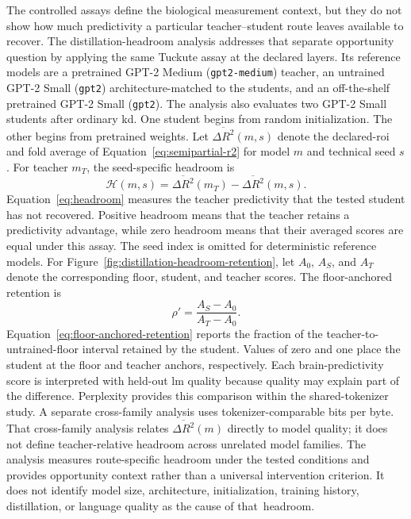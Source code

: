 The controlled assays define the biological measurement context, but they do not show how much predictivity a particular teacher--student route leaves available to recover.
The distillation-headroom analysis addresses that separate opportunity question by applying the same Tuckute assay at the declared layers.
Its reference models are a pretrained GPT-2 Medium (\texttt{gpt2-medium}) teacher, an untrained GPT-2 Small (\texttt{gpt2}) architecture-matched to the students, and an off-the-shelf pretrained GPT-2 Small (\texttt{gpt2}).
The analysis also evaluates two GPT-2 Small students after ordinary \ac{kd}.
One student begins from random initialization.
The other begins from pretrained weights.
Let \(\overline{\Delta R^2}(m,s)\) denote the declared-\ac{roi} and fold average of Equation~\ref{eq:semipartial-r2} for model \(m\) and technical seed \(s\).
For teacher \(m_T\), the seed-specific headroom is
\begin{equation}
\mathcal H(m,s)
=
\overline{\Delta R^2}(m_T)
-
\overline{\Delta R^2}(m,s).
\label{eq:headroom}
\end{equation}
Equation~\ref{eq:headroom} measures the teacher predictivity that the tested student has not recovered.
Positive headroom means that the teacher retains a predictivity advantage, while zero headroom means that their averaged scores are equal under this assay.
The seed index is omitted for deterministic reference models.
For Figure~\ref{fig:distillation-headroom-retention}, let \(A_0\), \(A_S\), and \(A_T\) denote the corresponding floor, student, and teacher scores.
The floor-anchored retention is
\begin{equation}
\rho'
=
\frac{A_S-A_0}{A_T-A_0}.
\label{eq:floor-anchored-retention}
\end{equation}
Equation~\ref{eq:floor-anchored-retention} reports the fraction of the teacher-to-untrained-floor interval retained by the student.
Values of zero and one place the student at the floor and teacher anchors, respectively.
Each brain-predictivity score is interpreted with held-out \ac{lm} quality because quality may explain part of the difference.
Perplexity provides this comparison within the shared-tokenizer study.
A separate cross-family analysis uses tokenizer-comparable bits per byte.
That cross-family analysis relates \(\overline{\Delta R^2}(m)\) directly to model quality; it does not define teacher-relative headroom across unrelated model families.
The analysis measures route-specific headroom under the tested conditions and provides opportunity context rather than a universal intervention criterion.
It does not identify model size, architecture, initialization, training history, distillation, or language quality as the cause of that~headroom.

